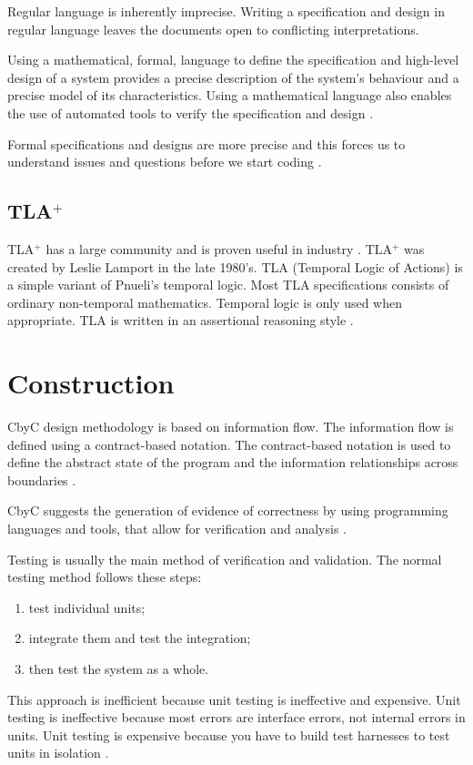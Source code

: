 Regular language is inherently imprecise. Writing a specification and design in 
regular language leaves the documents open to conflicting interpretations.

Using a mathematical, formal, language to define the specification and high-level
design of a system provides a precise description of the system's behaviour and
a precise model of its characteristics. Using a mathematical language also 
enables the use of automated tools to verify the specification and design \parencite{CbyCMan}.

Formal specifications and designs are more precise and this forces us to
understand issues and questions before we start coding \parencite{CbyCPraxis}.

\subsection{TLA\(^+\)}

TLA\(^+\) has a large community and is proven useful in industry 
\parencite{Industrial_Use_of_TLA}. TLA\(^+\) was created by Leslie Lamport in the
late 1980's. TLA (Temporal Logic of Actions) is a simple variant of Pnueli's 
temporal logic. Most TLA specifications consists of ordinary non-temporal 
mathematics. Temporal logic is only used when appropriate. TLA is written in an
assertional reasoning style \parencite{SpecifyingSystems}.

\section{Construction}

CbyC design methodology is based on information flow. The information flow is
defined using a contract-based notation. The contract-based notation is
used to define the abstract state of the program and the information relationships
across boundaries \parencite{CbyCMan}. 

CbyC suggests the generation of evidence of correctness by using programming
languages and tools, that allow for verification and analysis \parencite{CbyCMan}.

Testing is usually the main method of verification and validation. The normal testing
method follows these steps:
\begin{enumerate}
	\item test individual units; 
	\item integrate them and test the integration; 
	\item then test the system as a whole. 
\end{enumerate}
This approach is inefficient because unit testing is ineffective and expensive. 
Unit testing is ineffective because most errors are interface errors, not internal
errors in units. Unit testing is expensive because you have to build test 
harnesses to test units in isolation \parencite{CbyCPraxis}.

